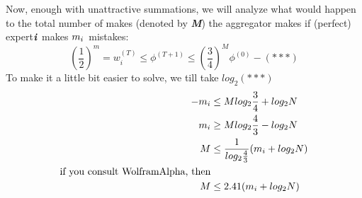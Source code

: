 \documentclass[12pt]{article}
\begin{document}
Now, enough with unattractive summations, we will analyze what would happen to the total number of makes (denoted by \textbf{\textit{M}}) the aggregator makes  if (perfect) expert$\textbf{\textit{i}}$ makes $ \textbf{\textit{$m_i$ }} $mistakes:
$$  \left ( \frac{1}{2} \right) ^m = w_i^{(T)}  \leq  \phi^{(T+1)} \leq \left (\frac{3}{4} \right )^M \phi^{(0)} -(***)$$
To make it a little bit easier to solve, we till take  $log_2(***)$  
\begin{align*}
-m_i &\leq Mlog_2\frac{3}{4} + log_2N\\
m_i &\geq Mlog_2\frac{4}{3} - log_2N\\
M &\leq \frac{1}{log_2\frac{4}{3}} (m_i +  log_2N)\\
\textmd{if you consult WolframAlpha, then}\\
M & \leq 2.41 (m_i +  log_2N)\\
\end{align*}
\end{document}
